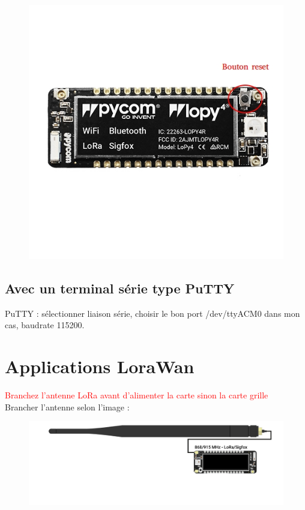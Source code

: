 \documentclass{article}
\begin{document}
\begin{figure}[H]
\begin{center}
\advance\leftskip-3cm
\advance\rightskip-3cm
\includegraphics[keepaspectratio=true,scale=0.3]{reset.jpeg}
\label{visina8}
\end{center}\end{figure}

\subsection{Avec un terminal série type PuTTY}

PuTTY : sélectionner liaison série, choisir le bon port /dev/ttyACM0 dans mon cas, baudrate 115200.


\section{Applications LoraWan}


\textcolor{red}{Branchez l'antenne LoRa avant d'alimenter la carte sinon la carte grille}\\

Brancher l'antenne selon l'image :

 \begin{figure}[H]
\begin{center}
\advance\leftskip-3cm
\advance\rightskip-3cm
\includegraphics[keepaspectratio=true,scale=0.3]{antennes_lopy.png}
\label{visina8}
\end{center}\end{figure}
\end{document}
